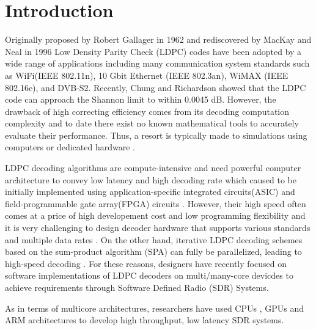\documentclass[conference]{IEEEtran}
\begin{document}

\IEEEpeerreviewmaketitle



\section{Introduction}
Originally proposed by Robert Gallager in 1962 \cite{art_gallager} and rediscovered by MacKay and Neal in 1996 \cite{art_macKay} Low Density Parity Check (LDPC) codes have been adopted by a wide range of applications including many communication system standards such as WiFi(IEEE 802.11n), 10 Gbit Ethernet (IEEE 802.3an), WiMAX (IEEE 802.16e), and DVB-S2. Recently, Chung and Richardson \cite{art_shannon} showed that the LDPC code can approach the Shannon limit to within 0.0045 dB. However, the drawback of high correcting efficiency comes from its decoding computation complexity \cite{art_ldpc_cpu1} and to date there exist no known mathematical tools to accurately evaluate their performance. Thus, a resort is typically made to simulations using computers or dedicated hardware \cite{art_memory_coalesced}.

LDPC decoding algorithms are compute-intensive and need powerful computer architecture to convey low latency and high decoding rate which caused to be initially implemented using application-specific integrated circuits(ASIC) and field-programmable gate array(FPGA) circuits \cite{art_ldpc_OpenCl_1}. However, their high speed often comes at a price of high developement cost and low programming flexibility \cite{art_convolutional} and it is very challenging to design decoder hardware that supports various standards and multiple data rates \cite{art_cuda_openmp}. On the other hand, iterative LDPC decoding schemes based on the sum-product algorithm (SPA) can fully be parallelized, leading to high-speed decoding \cite{art_shannon}. For these reasons, designers have recently focused on software implementations of LDPC decoders on multi/many-core devicdes \cite{art_massively} to achieve requirements through Software Defined Radio (SDR) Systems.

As in terms of multicore architectures, researchers have used CPUs \cite{art_cpu_gpu, art_ldpc_cpu0}, GPUs \cite{art_memory_coalesced, art_massively, art_optimize_0}and ARM \cite{art_ldpc_cpu0, art_neon} architectures to develop high throughput, low latency SDR systems. 
\end{document}
